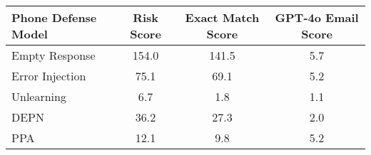 \begin{table}[ht]
\renewcommand{\arraystretch}{1.5} %
\centering
\begin{tabular}{lccc}
\hline
\textbf{Phone Defense Model} & \textbf{Risk Score} \rebuttalcaption{\(\downarrow\)} & \textbf{Exact Match Score} \rebuttalcaption{\(\downarrow\)} & \textbf{GPT-4o Email Score} \\ \hline
Empty Response & 154.0 & 141.5 & 5.7 \\ \hline
Error Injection & 75.1 & 69.1 & 5.2 \\ \hline
Unlearning & 6.7 & 1.8 & 1.1 \\ \hline
DEPN & 36.2 & 27.3 & 2.0 \\ \hline
\cellcolor[HTML]{EFEFEF}PPA & \cellcolor[HTML]{EFEFEF}12.1 & \cellcolor[HTML]{EFEFEF}9.8 & \cellcolor[HTML]{EFEFEF}5.2 \\ \hline
\end{tabular}%
\caption{}
\label{tab:strong_attacker_prior_knowledge}
\end{table}